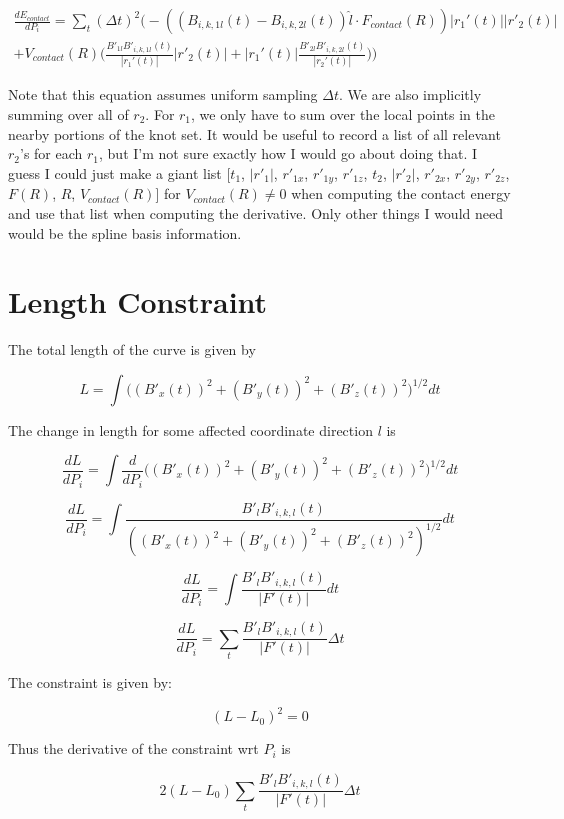 \documentclass{article}
\begin{document}
\begin{multline}
    \frac{dE_{contact}}{dP_i} = \sum_t (\Delta t)^2 \bigg(-((B_{i,k,1l}(t)-B_{i,k,2l}(t))\hat{l} \cdot F_{contact}(R))|r_1'(t)||r'_2(t)|  \\ 
    +  V_{contact}(R)\bigg(\frac{B'_{1l} B'_{i,k,1l}(t)}{|r_1'(t)|} |r'_2(t)| + |r_1'(t)|\frac{B'_{2l} B'_{i,k,2l}(t)}{|r_2'(t)|} \bigg)\bigg)
\end{multline}

Note that this equation assumes uniform sampling $\Delta t$. We are also implicitly summing over all of $r_2$. For $r_1$, we only have to sum over the local points in the nearby portions of the knot set. It would be useful to record a list of all relevant $r_2$'s for each $r_1$, but I'm not sure exactly how I would go about doing that.  I guess I could just make a giant list [$t_1$, $|r'_1|$, $r'_{1x}$, $r'_{1y}$, $r'_{1z}$, $t_2$, $|r'_2|$, $r'_{2x}$, $r'_{2y}$, $r'_{2z}$, $F(R)$, $\hat{R}$, $V_{contact}(R)$] for $V_{contact}(R) \neq 0$ when computing the contact energy and use that list when computing the derivative. Only other things I would need would be the spline basis information.

\section{Length Constraint}

The total length of the curve is given by 

\begin{equation}
    L = \int \bigg((B'_x(t))^2 + (B'_y(t))^2 + (B'_z(t))^2 \bigg)^{1/2} dt
\end{equation}

The change in length for some affected coordinate direction $l$ is

\begin{equation}
   \frac{dL}{dP_i}  = \int \frac{d}{dP_i} \bigg((B'_x(t))^2 + (B'_y(t))^2 + (B'_z(t))^2 \bigg)^{1/2} dt
\end{equation}

\begin{equation}
   \frac{dL}{dP_i}  = \int \frac{B'_{l} B'_{i,k,l}(t)}{((B'_x(t))^2 + (B'_y(t))^2 + (B'_z(t))^2)^{1/2}} dt
\end{equation}

\begin{equation}
   \frac{dL}{dP_i}  = \int \frac{B'_{l} B'_{i,k,l}(t)}{|F'(t)|} dt
\end{equation}

\begin{equation}
   \frac{dL}{dP_i}  = \sum_t \frac{B'_{l} B'_{i,k,l}(t)}{|F'(t)|} \Delta t
\end{equation}


The constraint is given by:

\begin{equation}
    (L-L_0)^2 = 0
\end{equation}

Thus the derivative of the constraint wrt $P_i$ is

\begin{equation}
    2(L-L_0) \sum_t \frac{B'_{l} B'_{i,k,l}(t)}{|F'(t)|} \Delta t
\end{equation}
\end{document}
